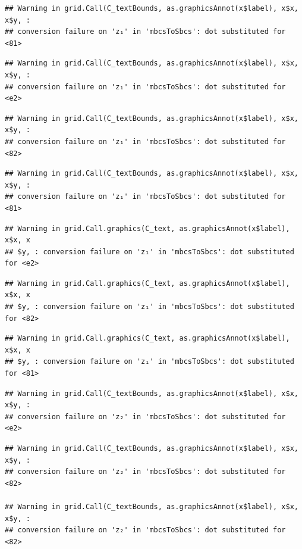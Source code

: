 \documentclass[]{article}
\begin{document}
\begin{verbatim}
## Warning in grid.Call(C_textBounds, as.graphicsAnnot(x$label), x$x, x$y, :
## conversion failure on 'z₁' in 'mbcsToSbcs': dot substituted for <81>
\end{verbatim}

\begin{verbatim}
## Warning in grid.Call(C_textBounds, as.graphicsAnnot(x$label), x$x, x$y, :
## conversion failure on 'z₁' in 'mbcsToSbcs': dot substituted for <e2>
\end{verbatim}

\begin{verbatim}
## Warning in grid.Call(C_textBounds, as.graphicsAnnot(x$label), x$x, x$y, :
## conversion failure on 'z₁' in 'mbcsToSbcs': dot substituted for <82>
\end{verbatim}

\begin{verbatim}
## Warning in grid.Call(C_textBounds, as.graphicsAnnot(x$label), x$x, x$y, :
## conversion failure on 'z₁' in 'mbcsToSbcs': dot substituted for <81>
\end{verbatim}

\begin{verbatim}
## Warning in grid.Call.graphics(C_text, as.graphicsAnnot(x$label), x$x, x
## $y, : conversion failure on 'z₁' in 'mbcsToSbcs': dot substituted for <e2>
\end{verbatim}

\begin{verbatim}
## Warning in grid.Call.graphics(C_text, as.graphicsAnnot(x$label), x$x, x
## $y, : conversion failure on 'z₁' in 'mbcsToSbcs': dot substituted for <82>
\end{verbatim}

\begin{verbatim}
## Warning in grid.Call.graphics(C_text, as.graphicsAnnot(x$label), x$x, x
## $y, : conversion failure on 'z₁' in 'mbcsToSbcs': dot substituted for <81>
\end{verbatim}

\begin{verbatim}
## Warning in grid.Call(C_textBounds, as.graphicsAnnot(x$label), x$x, x$y, :
## conversion failure on 'z₂' in 'mbcsToSbcs': dot substituted for <e2>
\end{verbatim}

\begin{verbatim}
## Warning in grid.Call(C_textBounds, as.graphicsAnnot(x$label), x$x, x$y, :
## conversion failure on 'z₂' in 'mbcsToSbcs': dot substituted for <82>

## Warning in grid.Call(C_textBounds, as.graphicsAnnot(x$label), x$x, x$y, :
## conversion failure on 'z₂' in 'mbcsToSbcs': dot substituted for <82>
\end{verbatim}
\end{document}
